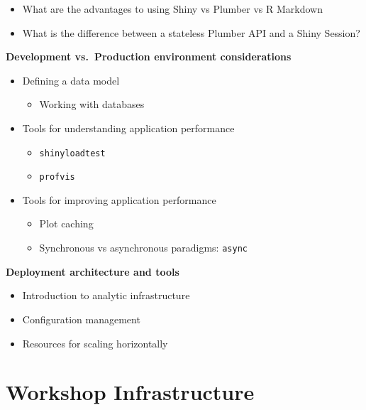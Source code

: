 \documentclass[]{book}
\providecommand{\tightlist}{%
  \setlength{\itemsep}{0pt}\setlength{\parskip}{0pt}}
\theoremstyle{definition}
\theoremstyle{definition}
\theoremstyle{definition}
\theoremstyle{remark}
\begin{document}
\begin{itemize}
\tightlist
\item
  What are the advantages to using Shiny vs Plumber vs R Markdown
\item
  What is the difference between a stateless Plumber API and a Shiny
  Session?
\end{itemize}

\textbf{Development vs.~Production environment considerations}

\begin{itemize}
\tightlist
\item
  Defining a data model

  \begin{itemize}
  \tightlist
  \item
    Working with databases
  \end{itemize}
\item
  Tools for understanding application performance

  \begin{itemize}
  \tightlist
  \item
    \texttt{shinyloadtest}
  \item
    \texttt{profvis}
  \end{itemize}
\item
  Tools for improving application performance

  \begin{itemize}
  \tightlist
  \item
    Plot caching
  \item
    Synchronous vs asynchronous paradigms: \texttt{async}
  \end{itemize}
\end{itemize}

\textbf{Deployment architecture and tools}

\begin{itemize}
\tightlist
\item
  Introduction to analytic infrastructure
\item
  Configuration management
\item
  Resources for scaling horizontally
\end{itemize}

\hypertarget{workshop-infrastructure}{%
\section{Workshop Infrastructure}\label{workshop-infrastructure}}
\end{document}
